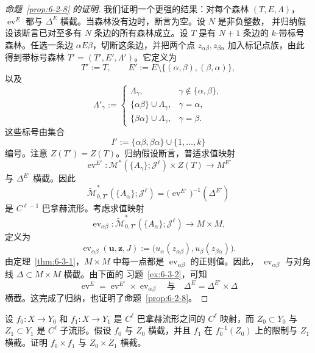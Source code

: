\begin{proof}[命题~\ref{prop:6-2-8} 的证明]
我们证明一个更强的结果：对每个森林 $(T,E,\Lambda)$，
$\operatorname{ev}^E$ 都与 $\Delta^E$ 横截。当森林没有边时，断言为空。设 $N$ 是非负整数，
并归纳假设该断言已对至多有 $N$ 条边的所有森林成立。设 $T$ 是有 $N+1$ 条边的
$k$-带标号森林。任选一条边 $\alpha E\beta$，切断这条边，并把两个点
$z_{\alpha\beta},z_{\beta\alpha}$ 加入标记点族，由此得到带标号森林
$T'=(T',E',\Lambda')$。它定义为
\[
  T':=T,
  \qquad
  E':=E\setminus\{(\alpha,\beta),(\beta,\alpha)\},
\]
以及
\[
  \Lambda'_\gamma:=
  \begin{cases}
    \Lambda_\gamma,&\gamma\notin\{\alpha,\beta\},\\
    \{\alpha\beta\}\cup\Lambda_\gamma,&\gamma=\alpha,\\
    \{\beta\alpha\}\cup\Lambda_\gamma,&\gamma=\beta.
  \end{cases}
\]
这些标号由集合
\[
  I':=\{\alpha\beta,\beta\alpha\}\cup\{1,\ldots,k\}
\]
编号。注意 $Z(T')=Z(T)$。归纳假设断言，普适求值映射
\[
  \operatorname{ev}^{E'}:
  \mathcal M^*(\{A_\gamma\};\mathcal J^\ell)\times Z(T)
  \longrightarrow M^{E'}
\]
与 $\Delta^{E'}$ 横截。因此
\[
  \widetilde{\mathcal M}^*_{0,T'}(\{A_\alpha\};\mathcal J^\ell)
  =\bigl(\operatorname{ev}^{E'}\bigr)^{-1}(\Delta^{E'})
\]
是 $C^{\ell-1}$ 巴拿赫流形。考虑求值映射
\[
  \operatorname{ev}_{\alpha\beta}:
  \widetilde{\mathcal M}^*_{0,T'}(\{A_\alpha\};\mathcal J^\ell)
  \longrightarrow M\times M,
\]
定义为
\[
  \operatorname{ev}_{\alpha\beta}(\mathbf u,\mathbf z,J)
  :=\bigl(u_\alpha(z_{\alpha\beta}),u_\beta(z_{\beta\alpha})\bigr).
\]
由定理~\ref{thm:6-3-1}，$M\times M$ 中每一点都是
$\operatorname{ev}_{\alpha\beta}$ 的正则值。因此，
$\operatorname{ev}_{\alpha\beta}$ 与对角线 $\Delta\subset M\times M$ 横截。由下面的
习题~\ref{ex:6-3-2}，可知
\[
  \operatorname{ev}^E
  =\operatorname{ev}^{E'}\times\operatorname{ev}_{\alpha\beta}
  \quad\text{与}\quad
  \Delta^E=\Delta^{E'}\times\Delta
\]
横截。这完成了归纳，也证明了命题~\ref{prop:6-2-8}。
\end{proof}

\begin{exercise}\label{ex:6-3-2}
设 $f_0:X\to Y_0$ 和 $f_1:X\to Y_1$ 是 $C^\ell$ 巴拿赫流形之间的
$C^\ell$ 映射，而 $Z_0\subset Y_0$ 与 $Z_1\subset Y_1$ 是 $C^\ell$ 子流形。假设
$f_0$ 与 $Z_0$ 横截，并且 $f_1$ 在 $f_0^{-1}(Z_0)$ 上的限制与 $Z_1$ 横截。证明
$f_0\times f_1$ 与 $Z_0\times Z_1$ 横截。
\end{exercise}

